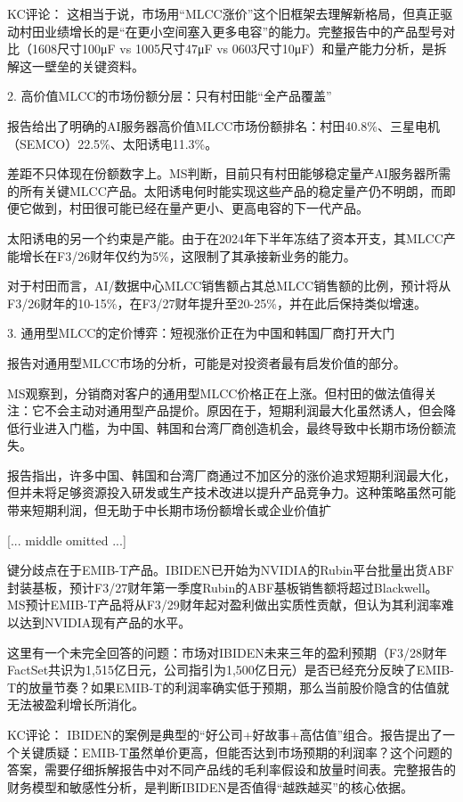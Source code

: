 \documentclass[11pt]{ctexart}
\begin{document}
KC评论： 这相当于说，市场用“MLCC涨价”这个旧框架去理解新格局，但真正驱动村田业绩增长的是“在更小空间塞入更多电容”的能力。完整报告中的产品型号对比（1608尺寸100μF vs 1005尺寸47μF vs 0603尺寸10μF）和量产能力分析，是拆解这一壁垒的关键资料。

2. 高价值MLCC的市场份额分层：只有村田能“全产品覆盖”

报告给出了明确的AI服务器高价值MLCC市场份额排名：村田40.8\%、三星电机（SEMCO）22.5\%、太阳诱电11.3\%。

差距不只体现在份额数字上。MS判断，目前只有村田能够稳定量产AI服务器所需的所有关键MLCC产品。太阳诱电何时能实现这些产品的稳定量产仍不明朗，而即便它做到，村田很可能已经在量产更小、更高电容的下一代产品。

太阳诱电的另一个约束是产能。由于在2024年下半年冻结了资本开支，其MLCC产能增长在F3/26财年仅约为5\%，这限制了其承接新业务的能力。

对于村田而言，AI/数据中心MLCC销售额占其总MLCC销售额的比例，预计将从F3/26财年的10-15\%，在F3/27财年提升至20-25\%，并在此后保持类似增速。

3. 通用型MLCC的定价博弈：短视涨价正在为中国和韩国厂商打开大门

报告对通用型MLCC市场的分析，可能是对投资者最有启发价值的部分。

MS观察到，分销商对客户的通用型MLCC价格正在上涨。但村田的做法值得关注：它不会主动对通用型产品提价。原因在于，短期利润最大化虽然诱人，但会降低行业进入门槛，为中国、韩国和台湾厂商创造机会，最终导致中长期市场份额流失。

报告指出，许多中国、韩国和台湾厂商通过不加区分的涨价追求短期利润最大化，但并未将足够资源投入研发或生产技术改进以提升产品竞争力。这种策略虽然可能带来短期利润，但无助于中长期市场份额增长或企业价值扩

[... middle omitted ...]

键分歧点在于EMIB-T产品。IBIDEN已开始为NVIDIA的Rubin平台批量出货ABF封装基板，预计F3/27财年第一季度Rubin的ABF基板销售额将超过Blackwell。MS预计EMIB-T产品将从F3/29财年起对盈利做出实质性贡献，但认为其利润率难以达到NVIDIA现有产品的水平。

这里有一个未完全回答的问题：市场对IBIDEN未来三年的盈利预期（F3/28财年FactSet共识为1,515亿日元，公司指引为1,500亿日元）是否已经充分反映了EMIB-T的放量节奏？如果EMIB-T的利润率确实低于预期，那么当前股价隐含的估值就无法被盈利增长所消化。

KC评论： IBIDEN的案例是典型的“好公司+好故事+高估值”组合。报告提出了一个关键质疑：EMIB-T虽然单价更高，但能否达到市场预期的利润率？这个问题的答案，需要仔细拆解报告中对不同产品线的毛利率假设和放量时间表。完整报告的财务模型和敏感性分析，是判断IBIDEN是否值得“越跌越买”的核心依据。
\end{document}
